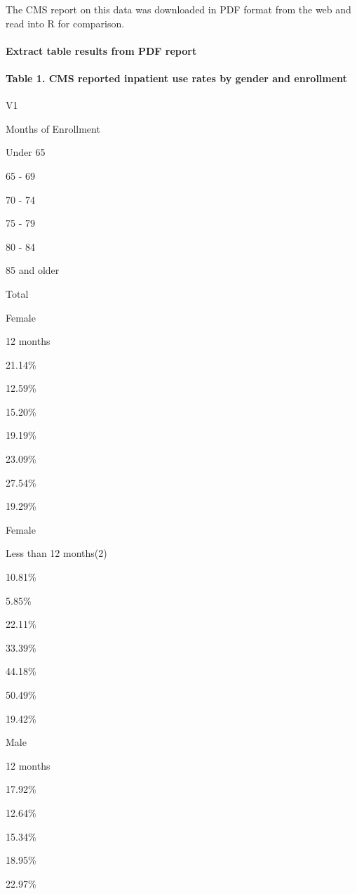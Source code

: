 \documentclass[]{article}
\let\oldparagraph\paragraph
\renewcommand{\paragraph}[1]{\oldparagraph{#1}\mbox{}}
\begin{document}
The CMS report on this data was downloaded in PDF format from the web
and read into R for comparison.

\hypertarget{extract-table-results-from-pdf-report}{%
\paragraph{Extract table results from PDF
report}\label{extract-table-results-from-pdf-report}}

\hypertarget{table-1.-cms-reported-inpatient-use-rates-by-gender-and-enrollment}{%
\paragraph{Table 1. CMS reported inpatient use rates by gender and
enrollment}\label{table-1.-cms-reported-inpatient-use-rates-by-gender-and-enrollment}}

V1

Months of Enrollment

Under 65

65 - 69

70 - 74

75 - 79

80 - 84

85 and older

Total

Female

12 months

21.14\%

12.59\%

15.20\%

19.19\%

23.09\%

27.54\%

19.29\%

Female

Less than 12 months(2)

10.81\%

5.85\%

22.11\%

33.39\%

44.18\%

50.49\%

19.42\%

Male

12 months

17.92\%

12.64\%

15.34\%

18.95\%

22.97\%
\end{document}
